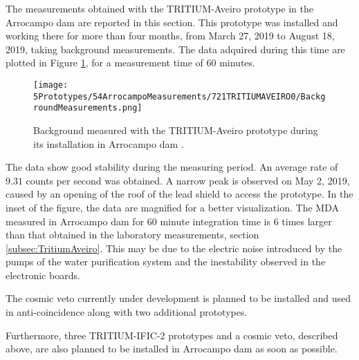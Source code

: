 
The measurements obtained with the TRITIUM-Aveiro prototype in the Arrocampo dam are reported in this section. This prototype was installed and working there for more than four months, from March 27, 2019 to August 18, 2019, taking background measurements. The data adquired during this time are plotted in Figure \ref{fig:BackgroundArrocampoAveiro}, for a measurement time of 60 minutes.

\begin{figure}[h]
\centering
\texttt{[image: 5Prototypes/54ArrocampoMeasurements/721TRITIUMAVEIRO0/BackgroundMeasurements.png]}
\caption{Background measured with the TRITIUM-Aveiro prototype during its installation in Arrocampo dam \cite{ExperimentalPaperCarlos}.\label{fig:BackgroundArrocampoAveiro}}
\end{figure}
The data show good stability during the measuring period. An average rate of $9.31$ counts per second was obtained. A narrow peak is observed on May 2, 2019, caused by an opening of the roof of the lead shield to access the prototype. In the inset of the figure, the data are magnified for a better visualization. The MDA measured in Arrocampo dam for 60 minute integration time is 6 times larger than that obtained in the laboratory measurements, section \ref{subsec:TritiumAveiro}. This may be due to the electric noise introduced by the pumps of the water purification system and the inestability observed in the electronic boards.

The cosmic veto currently under development is planned to be installed and used in anti-coincidence along with two additional prototypes.

Furthermore, three TRITIUM-IFIC-2 prototypes and a cosmic veto, described above, are also planned to be installed in Arrocampo dam as soon as possible.